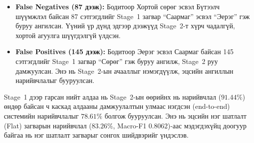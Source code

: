 \begin{itemize}
    \item \textbf{False Negatives (87 дээж):} Бодитоор Хортой сөрөг эсвэл Бүтээлч шүүмжлэл
    байсан 87 сэтгэгдлийг Stage~1 загвар ``Саармаг'' эсвэл ``Эерэг'' гэж
    буруу ангилсан. Үүний үр дүнд эдгээр дээжүүд Stage~2-т хүрч чадалгүй,
    хортой агуулга шүүгдэлгүй үлдсэн.
    \item \textbf{False Positives (145 дээж):} Бодитоор Эерэг эсвэл Саармаг
    байсан 145 сэтгэгдлийг Stage~1 загвар ``Сөрөг'' гэж буруу ангилж,
    Stage~2 руу дамжуулсан. Энэ нь Stage~2-ын ачааллыг нэмэгдүүлж, эцсийн
    ангиллын нарийвчлалыг бууруулсан.
\end{itemize}

Stage~1 дээр гарсан нийт алдаа нь Stage~2-ын өөрийнх нь нарийвчлал ($91.44\%$) өндөр
байсан ч каскад алдааны дамжуулалтын улмаас нэгдсэн (end-to-end) системийн
нарийвчлалыг $78.61\%$ болгож бууруулсан. Энэ нь эцсийн нэг шатлалт (Flat)
загварын нарийвчлал ($83.26\%$, Macro-F1 $0.8062$)-аас мэдэгдэхүйц доогуур
байгаа нь нэг шатлалт загварыг сонгох шийдвэрийг үндэслэв.

\begin{table}[H]
\centering
\caption{Эцсийн нэг шатлалт MN-BERT загварын ангилал тус бүрийн гүйцэтгэл (Focal Loss + Cosine Warmup, $n=1{,}529$)}
\label{tab:e2e}
\end{table}

